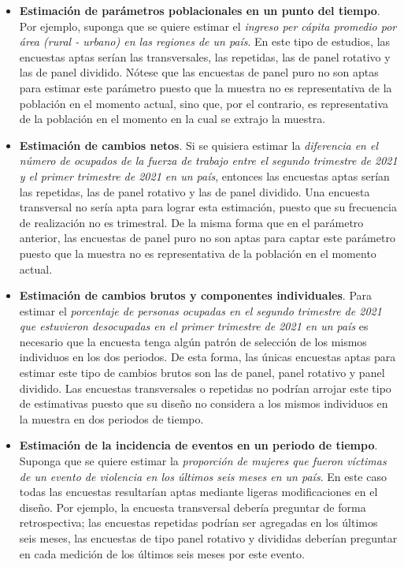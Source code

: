 \documentclass[
  12pt,
  spanish,
]{book}
\begin{document}
\begin{itemize}
\item
  \textbf{Estimación de parámetros poblacionales en un punto del tiempo}. Por ejemplo, suponga que se quiere estimar el \emph{ingreso per cápita promedio por área (rural - urbano) en las regiones de un país}. En este tipo de estudios, las encuestas aptas serían las transversales, las repetidas, las de panel rotativo y las de panel dividido. Nótese que las encuestas de panel puro no son aptas para estimar este parámetro puesto que la muestra no es representativa de la población en el momento actual, sino que, por el contrario, es representativa de la población en el momento en la cual se extrajo la muestra.
\item
  \textbf{Estimación de cambios netos}. Si se quisiera estimar la \emph{diferencia en el número de ocupados de la fuerza de trabajo entre el segundo trimestre de 2021 y el primer trimestre de 2021 en un país}, entonces las encuestas aptas serían las repetidas, las de panel rotativo y las de panel dividido. Una encuesta transversal no sería apta para lograr esta estimación, puesto que su frecuencia de realización no es trimestral. De la misma forma que en el parámetro anterior, las encuestas de panel puro no son aptas para captar este parámetro puesto que la muestra no es representativa de la población en el momento actual.
\item
  \textbf{Estimación de cambios brutos y componentes individuales}. Para estimar el \emph{porcentaje de personas ocupadas en el segundo trimestre de 2021 que estuvieron desocupadas en el primer trimestre de 2021 en un país} es necesario que la encuesta tenga algún patrón de selección de los mismos individuos en los dos periodos. De esta forma, las únicas encuestas aptas para estimar este tipo de cambios brutos son las de panel, panel rotativo y panel dividido. Las encuestas transversales o repetidas no podrían arrojar este tipo de estimativas puesto que su diseño no considera a los mismos individuos en la muestra en dos periodos de tiempo.
\item
  \textbf{Estimación de la incidencia de eventos en un periodo de tiempo}. Suponga que se quiere estimar la \emph{proporción de mujeres que fueron víctimas de un evento de violencia en los últimos seis meses en un país}. En este caso todas las encuestas resultarían aptas mediante ligeras modificaciones en el diseño. Por ejemplo, la encuesta transversal debería preguntar de forma retrospectiva; las encuestas repetidas podrían ser agregadas en los últimos seis meses, las encuestas de tipo panel rotativo y divididas deberían preguntar en cada medición de los últimos seis meses por este evento.

\end{itemize}
\end{document}
